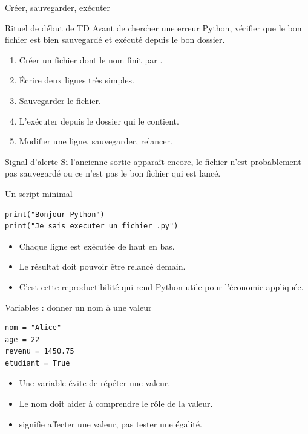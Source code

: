 \documentclass[10pt,aspectratio=169]{beamer}
\begin{document}
\begin{frame}{Créer, sauvegarder, exécuter}
\begin{block}{Rituel de début de TD}
Avant de chercher une erreur Python, vérifier que le bon fichier est bien sauvegardé et exécuté depuis le bon dossier.
\end{block}
\begin{enumerate}
  \item Créer un fichier dont le nom finit par .
  \item Écrire deux lignes très simples.
  \item Sauvegarder le fichier.
  \item L'exécuter depuis le dossier qui le contient.
  \item Modifier une ligne, sauvegarder, relancer.
\end{enumerate}
\begin{block}{Signal d'alerte}
Si l'ancienne sortie apparaît encore, le fichier n'est probablement pas sauvegardé ou ce n'est pas le bon fichier qui est lancé.
\end{block}
\end{frame}

\begin{frame}[fragile]{Un script minimal}
\begin{lstlisting}
print("Bonjour Python")
print("Je sais executer un fichier .py")
\end{lstlisting}
\begin{itemize}
  \item Chaque ligne est exécutée de haut en bas.
  \item Le résultat doit pouvoir être relancé demain.
  \item C'est cette reproductibilité qui rend Python utile pour l'économie appliquée.
\end{itemize}
\end{frame}

\begin{frame}[fragile]{Variables : donner un nom à une valeur}
\begin{lstlisting}
nom = "Alice"
age = 22
revenu = 1450.75
etudiant = True
\end{lstlisting}
\begin{itemize}
  \item Une variable évite de répéter une valeur.
  \item Le nom doit aider à comprendre le rôle de la valeur.
  \item \code{=} signifie affecter une valeur, pas tester une égalité.
\end{itemize}
\end{frame}
\end{document}
